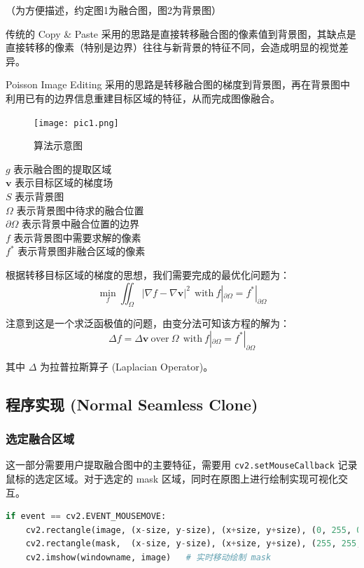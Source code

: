 \documentclass[lang=cn,11pt,a4paper]{elegantpaper}
\begin{document}
（为方便描述，约定图1为{\heiti 融合图}，图2为{\heiti 背景图}）

传统的 Copy \& Paste 采用的思路是直接转移{\heiti 融合图}的像素值到{\heiti 背景图}，其缺点是直接转移的像素（特别是边界）往往与新背景的特征不同，会造成明显的视觉差异。

Poisson Image Editing 采用的思路是转移{\heiti 融合图}的{\heiti 梯度}到{\heiti 背景图}，再在{\heiti 背景图}中利用已有的边界信息重建目标区域的特征，从而完成图像融合。


\begin{figure}
    \centering
    \texttt{[image: pic1.png]}
    \caption{算法示意图}
\end{figure}


\noindent
$g$ 表示融合图的提取区域\\
$\mathbf{v}$ 表示目标区域的梯度场\\
$S$ 表示背景图\\
$\Omega$ 表示背景图中待求的融合位置\\
$\partial \Omega$ 表示背景中融合位置的边界\\
$f$ 表示背景图中需要求解的像素\\
$f^{*}$ 表示背景图非融合区域的像素

\hfill


根据转移目标区域的梯度的思想，我们需要完成的最优化问题为：
\begin{equation}
\min\limits_f \iint _\Omega |\nabla f-\nabla \boldsymbol v |^2 \ \ \mathrm{with}\ f|_{\partial \Omega}=f^*|_{\partial \Omega}
\end{equation}

注意到这是一个求泛函极值的问题，由变分法可知该方程的解为：
\begin{equation}
\Delta f= \Delta \boldsymbol v\ \mathrm{over}\ \Omega \ \ \mathrm{with}\ f|_{\partial \Omega}=f^*|_{\partial \Omega}
\end{equation}

其中 $\Delta$ 为拉普拉斯算子 (Laplacian Operator)。


\subsection{程序实现 (Normal Seamless Clone)}

\subsubsection{选定融合区域}

这一部分需要用户提取融合图中的主要特征，需要用 \lstinline{cv2.setMouseCallback} 记录鼠标的选定区域。对于选定的 mask 区域，同时在原图上进行绘制实现可视化交互。
\begin{lstlisting}[language=Python]
if event == cv2.EVENT_MOUSEMOVE:
    cv2.rectangle(image, (x-size, y-size), (x+size, y+size), (0, 255, 0),     -1)
    cv2.rectangle(mask,  (x-size, y-size), (x+size, y+size), (255, 255, 255), -1)
    cv2.imshow(windowname, image)   # 实时移动绘制 mask
\end{lstlisting}
\end{document}
